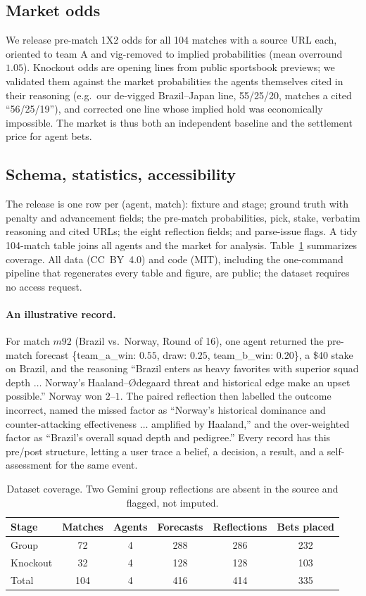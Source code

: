 \documentclass[sigconf,review]{acmart}
\begin{document}
\subsection{Market odds}
\label{sec:odds}
We release pre-match 1X2 odds for all 104 matches with a source URL each,
oriented to team A and vig-removed to implied probabilities (mean overround
$1.05$). Knockout odds are opening lines from public sportsbook previews; we
validated them against the market probabilities the agents themselves cited in
their reasoning (e.g.\ our de-vigged Brazil--Japan line, 55/25/20, matches a
cited ``56/25/19''), and corrected one line whose implied hold was
economically impossible. The market is thus both an independent baseline and the
settlement price for agent bets.

\subsection{Schema, statistics, accessibility}
The release is one row per (agent, match): fixture and stage; ground truth with
penalty and advancement fields; the pre-match probabilities, pick, stake,
verbatim reasoning and cited URLs; the eight reflection fields; and parse-issue
flags. A tidy 104-match table joins all agents and the market for analysis.
Table~\ref{tab:stats} summarizes coverage. All data (CC~BY~4.0) and code (MIT),
including the one-command pipeline that regenerates every table and figure, are
public; the dataset requires no access request.

\paragraph{An illustrative record.} For match $m92$ (Brazil vs.\ Norway,
Round of 16), one agent returned the pre-match forecast \{team\_a\_win: $0.55$,
draw: $0.25$, team\_b\_win: $0.20$\}, a \$40 stake on Brazil, and the reasoning
``Brazil enters as heavy favorites with superior squad depth $\ldots$ Norway's
Haaland--{\O}degaard threat and historical edge make an upset possible.'' Norway
won $2$--$1$. The paired reflection then labelled the outcome
\textsf{incorrect}, named the missed factor as ``Norway's historical dominance
and counter-attacking effectiveness $\ldots$ amplified by Haaland,'' and the
over-weighted factor as ``Brazil's overall squad depth and pedigree.'' Every
record has this pre/post structure, letting a user trace a belief, a decision, a
result, and a self-assessment for the same event.

\begin{table}[t]
\caption{Dataset coverage. Two Gemini group reflections are absent in the source
and flagged, not imputed.}
\label{tab:stats}
\small
\begin{tabular}{lccccc}
\toprule
Stage & Matches & Agents & Forecasts & Reflections & Bets placed \\
\midrule
Group    & 72  & 4 & 288 & 286 & 232 \\
Knockout & 32  & 4 & 128 & 128 & 103 \\
\midrule
Total    & 104 & 4 & 416 & 414 & 335 \\
\bottomrule
\end{tabular}
\end{table}
\end{document}

